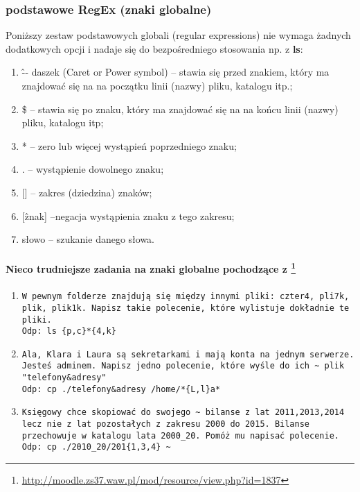 \documentclass[a4paper,titlepage,12pt]{mwart}
\begin{document}
\subsubsection{podstawowe RegEx (znaki globalne)}
Poniższy zestaw podstawowych globali (regular expressions) nie wymaga żadnych dodatkowych opcji i nadaje się
do bezpośredniego stosowania np. z \textbf{ls}:
\begin{enumerate}
\begin{enumerate}
\item {\^ -- daszek (Caret or Power symbol) -- stawia się przed znakiem, który ma znajdować się na na początku linii (nazwy) pliku, katalogu itp.;}
\item {\$ -- stawia się po znaku, który ma znajdować się na na końcu linii (nazwy) pliku, katalogu itp;}
\item {* -- zero lub więcej wystąpień poprzedniego znaku;}
\item {. -- wystąpienie dowolnego znaku;}
\item {[] -- zakres (dziedzina) znaków;}
\item {[\^znak] --negacja wystąpienia znaku z tego zakresu;}
\item {słowo -- szukanie danego słowa.}
\end{enumerate}
\end{enumerate}
\paragraph{Nieco trudniejsze zadania na znaki globalne pochodzące z \footnote{\url{http://moodle.zs37.waw.pl/mod/resource/view.php?id=1837}}}
\begin{enumerate}
\item{\begin{verbatim}
W pewnym folderze znajdują się między innymi pliki: czter4, pli7k, plik, plik1k. Napisz takie polecenie, które wylistuje dokładnie te pliki.
Odp: ls {p,c}*{4,k}
\end{verbatim}}
\item{\begin{verbatim}
Ala, Klara i Laura są sekretarkami i mają konta na jednym serwerze. Jesteś adminem. Napisz jedno polecenie, które wyśle do ich ~ plik "telefony&adresy"
Odp: cp ./telefony&adresy /home/*{L,l}a*
\end{verbatim}}
\item{\begin{verbatim}
Księgowy chce skopiować do swojego ~ bilanse z lat 2011,2013,2014 lecz nie z lat pozostałych z zakresu 2000 do 2015. Bilanse przechowuje w katalogu lata 2000_20. Pomóż mu napisać polecenie.
Odp: cp ./2010_20/201{1,3,4} ~
\end{verbatim}}
\end{enumerate}
\end{document}
